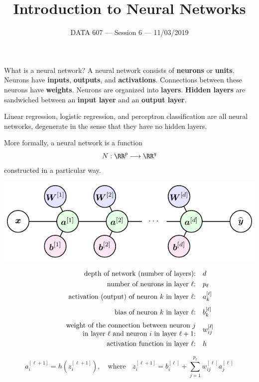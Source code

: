 \documentclass{beamer}
\newcommand{\lra}{\longrightarrow}
\begin{document}
    
\setlength{\parskip}{1em}
\begin{frame}
    \title{Introduction to Neural Networks}
    \date{DATA 607 --- Session 6 --- 11/03/2019}
    \maketitle
\end{frame}

\begin{frame}{What is a neural network?}
    A neural network consists of \textbf{neurons} or \textbf{units}.
    Neurons have \textbf{inputs}, \textbf{outputs}, and \textbf{activations}.
    Connections between these neurons have \textbf{weights}.
    Neurons are organized into \textbf{layers}. \textbf{Hidden layers}
    are sandwiched between an \textbf{input layer} and an \textbf{output layer}.

    Linear regression, logistic regression, and perceptron classification are all
    neural networks, degenerate in the sense that they have no hidden layers.
\end{frame}

\begin{frame}{}
    More formally, a neural network is a function
    \[
        N:\RR^p\lra \RR^q
    \]
    constructed in a particular way.

    \begin{center}
    \includegraphics{basic_nn_vectorized.pdf}
    \end{center}
\end{frame}

\begin{frame}{}
    \begin{align*}
        \text{depth of network (number of layers):\quad}&d\\
        \text{number of neurons in layer $\ell$:\quad}&p_\ell\\
        \text{activation (output) of neuron $k$ in layer $\ell$:\quad}
        & a_k^{[\ell]}\\[1ex]
        \text{bias of neuron $k$ in layer $\ell$:\quad}& b_k^{[\ell]}\\[1ex]
        \text{\parbox{3in}{\raggedleft weight of the connection between neuron $j$\\
        in layer $\ell$ and neuron $i$ in layer $\ell+1$:}\quad}& w^{[\ell]}_{ij}\\
        \text{activation function in layer $\ell$:\quad}&h
    \end{align*}

    \[
        a^{[\ell+1]}_i = h\left(z_i^{[\ell+1]}\right),
        \quad\text{where}\quad
        z_i^{[\ell+1]}=b_i^{[\ell]} + \sum_{j=1}^{p_\ell} w_{ij}^{[\ell]}a_j^{[\ell]}
    \]
\end{frame}
\end{document}
